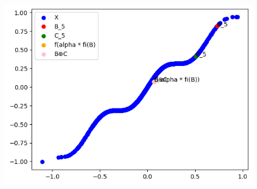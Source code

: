 \documentclass{report}
\begin{document}
            \begin{figure}[h]
                \centering
                \begin{minipage}{0.5\textwidth}
                    \centering
                    \includegraphics[width=0.9\linewidth]{./images/alpha5.png} %
                \end{minipage}%
                \begin{minipage}{0.5\textwidth}
                    \centering
                \end{minipage}
            \end{figure}
        \newpage
\end{document}
